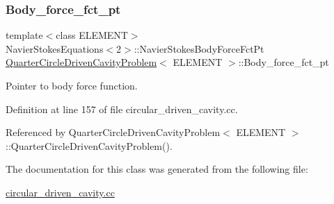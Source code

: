 \subsubsection{\texorpdfstring{Body\+\_\+force\+\_\+fct\+\_\+pt}{Body\_force\_fct\_pt}}
{\footnotesize\ttfamily template$<$class E\+L\+E\+M\+E\+NT$>$ \\
Navier\+Stokes\+Equations$<$2$>$\+::Navier\+Stokes\+Body\+Force\+Fct\+Pt \hyperlink{classQuarterCircleDrivenCavityProblem}{Quarter\+Circle\+Driven\+Cavity\+Problem}$<$ E\+L\+E\+M\+E\+NT $>$\+::Body\+\_\+force\+\_\+fct\+\_\+pt\hspace{0.3cm}{\ttfamily [private]}}



Pointer to body force function. 



Definition at line 157 of file circular\+\_\+driven\+\_\+cavity.\+cc.



Referenced by Quarter\+Circle\+Driven\+Cavity\+Problem$<$ E\+L\+E\+M\+E\+N\+T $>$\+::\+Quarter\+Circle\+Driven\+Cavity\+Problem().



The documentation for this class was generated from the following file\+:\begin{DoxyCompactItemize}
\item 
\hyperlink{circular__driven__cavity_8cc}{circular\+\_\+driven\+\_\+cavity.\+cc}\end{DoxyCompactItemize}
